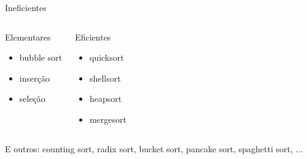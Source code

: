 \begin{frame}[label=main]
	\begin{center}
	\begin{minipage}{.25\textwidth}
		\begin{alertblock}{Ineficientes}
		\end{alertblock}
	\end{minipage}
	\vfill\pause
	\begin{columns}[T]
			\begin{block}{Elementares}
				\begin{itemize}
					\item bubble sort
					\item inserção
					\item seleção
				\end{itemize}
			\end{block}
			\pause
			\begin{exampleblock}{Eficientes}
				\begin{itemize}
					\item quicksort
					\item shellsort
					\item heapsort
					\item mergesort
				\end{itemize}
			\end{exampleblock}
	\end{columns}
	\end{center}
	\vfill\pause
	E outros: counting sort, radix sort, bucket sort, pancake sort, spaghetti sort, ...
\end{frame}